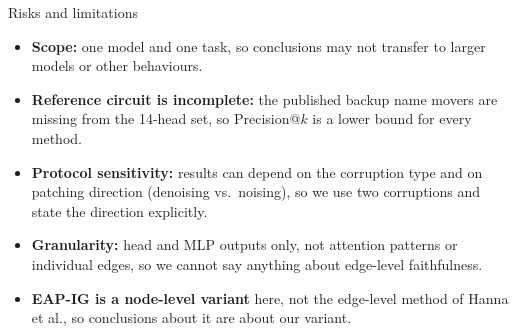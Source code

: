 \documentclass[aspectratio=169,10pt]{beamer}
\begin{document}
\begin{frame}{Risks and limitations}
\begin{itemize}
\item \textbf{Scope:} one model and one task, so conclusions may not transfer to larger models or other behaviours.
\item \textbf{Reference circuit is incomplete:} the published backup name movers are missing from the 14-head set, so Precision@$k$ is a lower bound for every method.
\item \textbf{Protocol sensitivity:} results can depend on the corruption type and on patching direction (denoising vs.\ noising), so we use two corruptions and state the direction explicitly.
\item \textbf{Granularity:} head and MLP outputs only, not attention patterns or individual edges, so we cannot say anything about edge-level faithfulness.
\item \textbf{EAP-IG is a node-level variant} here, not the edge-level method of Hanna et al., so conclusions about it are about our variant.
\end{itemize}
\end{frame}
\end{document}
